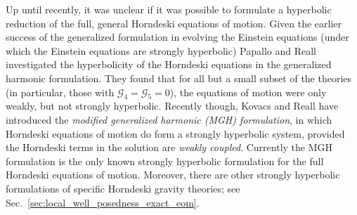 \documentclass{ws-ijmpd}
\begin{document}
Up until recently, it was unclear if it was possible to
formulate a hyperbolic reduction of the full, 
general Horndeski equations of motion.
Given the earlier success of the generalized formulation in evolving
the Einstein 
equations\cite{Garfinkle:2001ni,Pretorius:2004jg,Pretorius:2005gq,Pretorius:2006tp}
(under which the Einstein equations are strongly hyperbolic\cite{Friedrich:1996hq})
Papallo and Reall investigated the hyperbolicity of the
Horndeski equations in the generalized harmonic formulation.
They found that for all but a small subset of the theories
(in particular, those with $\mathcal{G}_4=\mathcal{G}_5=0$),
the equations of motion were only weakly, but not strongly
hyperbolic\cite{Papallo:2017qvl,Papallo:2017ddx}.
Recently though, Kovacs and Reall have introduced the
\emph{modified generalized harmonic (MGH) formulation}, in which 
Horndeski equations of motion do form a 
strongly hyperbolic system\cite{Kovacs:2020pns,Kovacs:2020ywu}, provided
the Horndeski terms in the solution are \emph{weakly coupled}.
Currently the MGH formulation is the
only known strongly hyperbolic formulation for the 
full Horndeski equations of motion.
Moreover, there are other strongly hyperbolic formulations of
specific Horndeski gravity theories;  
see Sec.~\ref{sec:local_well_posedness_exact_eom}.

\end{document}
